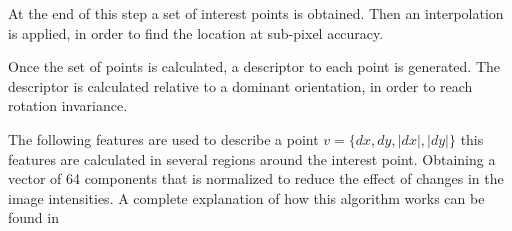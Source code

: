 At the end of this step a set of interest points is obtained. Then an interpolation is applied, in order to find the location 
at sub-pixel accuracy.

Once the set of points is calculated, a descriptor to each point is generated. The descriptor is calculated relative to a dominant 
orientation, in order to reach rotation invariance.
 
The following features are used to describe a point $v=\{dx,dy,|dx|,|dy|\}$ this features are calculated in several regions 
around the interest point. Obtaining a vector of 64 components that is normalized to reduce the effect of changes in the image 
intensities. A complete explanation of how this algorithm works can be found in \cite{OpenSURF}


